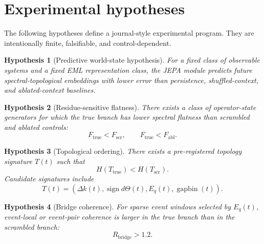 \documentclass[11pt]{article}
\newtheorem{hypothesis}{Hypothesis}
\begin{document}
\section{Experimental hypotheses}
The following hypotheses define a journal-style experimental program. They are intentionally finite, falsifiable, and control-dependent.

\begin{hypothesis}[Predictive world-state hypothesis]
For a fixed class of observable systems and a fixed EML representation class, the JEPA module predicts future spectral-topological embeddings with lower error than persistence, shuffled-context, and ablated-context baselines.
\end{hypothesis}

\begin{hypothesis}[Residue-sensitive flatness]
There exists a class of operator-state generators for which the true branch has lower spectral flatness than scrambled and ablated controls:
\begin{equation}
F_{\mathrm{true}}<F_{\mathrm{scr}},\qquad F_{\mathrm{true}}<F_{\mathrm{abl}}.
\end{equation}
\end{hypothesis}

\begin{hypothesis}[Topological ordering]
There exists a pre-registered topology signature $T(t)$ such that
\begin{equation}
H(T_{\mathrm{true}})<H(T_{\mathrm{scr}}).
\end{equation}
Candidate signatures include
\begin{equation}
T(t)=(\Delta k(t),\operatorname{sign}d\Theta(t),E_q(t),\operatorname{gapbin}(t)).
\end{equation}
\end{hypothesis}

\begin{hypothesis}[Bridge coherence]
For sparse event windows selected by $E_q(t)$, event-local or event-pair coherence is larger in the true branch than in the scrambled branch:
\begin{equation}
R_{\mathrm{bridge}}>1.2.
\end{equation}
\end{hypothesis}
\end{document}
